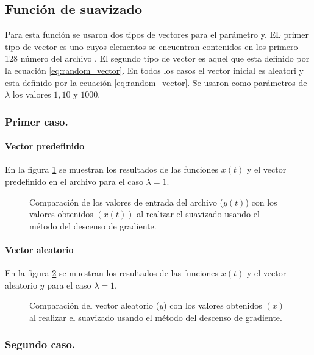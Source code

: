 
\subsection{Función de suavizado}

Para esta función se usaron dos tipos de vectores para el parámetro y. EL primer tipo de vector es uno cuyos elementos se encuentran contenidos en los primero 128 número del archivo . El segundo tipo de vector es aquel que esta definido por la ecuación \ref{eq:random_vector}. En todos los casos el vector inicial es aleatori y esta definido por la ecuación \ref{eq:random_vector}. Se usaron como parámetros de $\lambda$ los valores $1,10$ y $1000$.

\subsubsection{Primer caso.}

\paragraph{Vector predefinido}

En la figura \ref{fig:lambda_1_test} se muestran los resultados de las funciones $x(t)$ y el vector predefinido en el archivo  para el caso $\lambda=1$.

\begin{figure}[H]
    \centering
    \caption{Comparación de los valores de entrada del archivo  ($y(t)$) con los valores obtenidos $(x(t))$ al realizar el suavizado usando el método del descenso de gradiente.}
    \label{fig:lambda_1_test}
\end{figure}

\paragraph{Vector aleatorio}

En la figura \ref{fig:lambda_1} se muestran los resultados de las funciones $x(t)$ y el vector aleatorio $y$ para el caso $\lambda=1$.

\begin{figure}[H]
    \centering
    \caption{Comparación del vector aleatorio ($y$) con los valores obtenidos $(x)$ al realizar el suavizado usando el método del descenso de gradiente.}
    \label{fig:lambda_1}
\end{figure}

\subsubsection{Segundo caso.}

